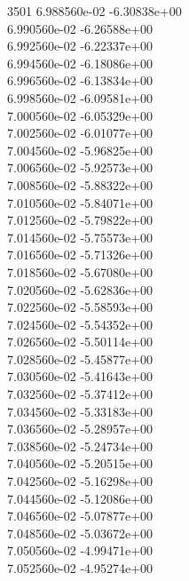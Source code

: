 3501	6.988560e-02	-6.30838e+00	\\ 	6.990560e-02	-6.26588e+00	\\ 	6.992560e-02	-6.22337e+00	\\ 	6.994560e-02	-6.18086e+00	\\ 	6.996560e-02	-6.13834e+00	\\ 	6.998560e-02	-6.09581e+00	\\ 	7.000560e-02	-6.05329e+00	\\ 	7.002560e-02	-6.01077e+00	\\ 	7.004560e-02	-5.96825e+00	\\ 	7.006560e-02	-5.92573e+00	\\ 	7.008560e-02	-5.88322e+00	\\ 	7.010560e-02	-5.84071e+00	\\ 	7.012560e-02	-5.79822e+00	\\ 	7.014560e-02	-5.75573e+00	\\ 	7.016560e-02	-5.71326e+00	\\ 	7.018560e-02	-5.67080e+00	\\ 	7.020560e-02	-5.62836e+00	\\ 	7.022560e-02	-5.58593e+00	\\ 	7.024560e-02	-5.54352e+00	\\ 	7.026560e-02	-5.50114e+00	\\ 	7.028560e-02	-5.45877e+00	\\ 	7.030560e-02	-5.41643e+00	\\ 	7.032560e-02	-5.37412e+00	\\ 	7.034560e-02	-5.33183e+00	\\ 	7.036560e-02	-5.28957e+00	\\ 	7.038560e-02	-5.24734e+00	\\ 	7.040560e-02	-5.20515e+00	\\ 	7.042560e-02	-5.16298e+00	\\ 	7.044560e-02	-5.12086e+00	\\ 	7.046560e-02	-5.07877e+00	\\ 	7.048560e-02	-5.03672e+00	\\ 	7.050560e-02	-4.99471e+00	\\ 	7.052560e-02	-4.95274e+00	\\ \hline
